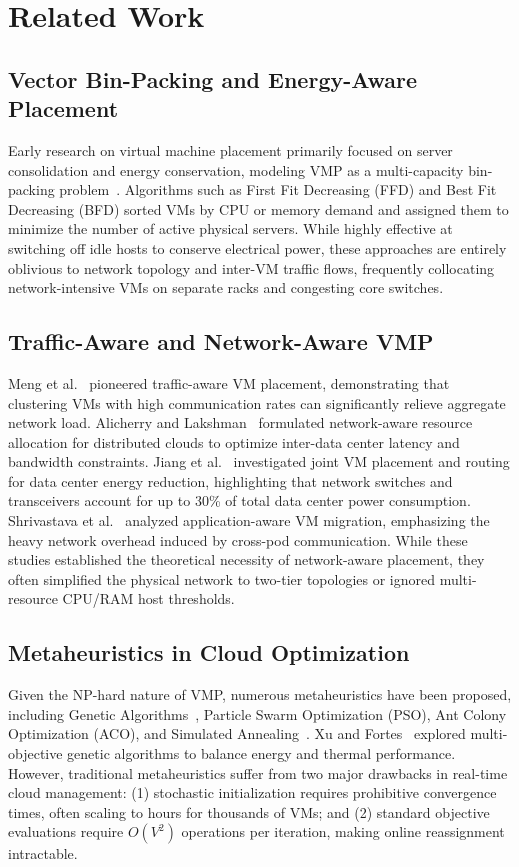 \documentclass[conference]{IEEEtran}
\begin{document}
\section{Related Work}
\label{sec:related}

\subsection{Vector Bin-Packing and Energy-Aware Placement}
Early research on virtual machine placement primarily focused on server consolidation and energy conservation, modeling VMP as a multi-capacity bin-packing problem~\cite{beloglazov2012optimal, mann2015allocation}. Algorithms such as First Fit Decreasing (FFD) and Best Fit Decreasing (BFD) sorted VMs by CPU or memory demand and assigned them to minimize the number of active physical servers. While highly effective at switching off idle hosts to conserve electrical power, these approaches are entirely oblivious to network topology and inter-VM traffic flows, frequently collocating network-intensive VMs on separate racks and congesting core switches.

\subsection{Traffic-Aware and Network-Aware VMP}
Meng et al.~\cite{meng2010improving} pioneered traffic-aware VM placement, demonstrating that clustering VMs with high communication rates can significantly relieve aggregate network load. Alicherry and Lakshman~\cite{alicherry2012network} formulated network-aware resource allocation for distributed clouds to optimize inter-data center latency and bandwidth constraints. Jiang et al.~\cite{joint2012joint} investigated joint VM placement and routing for data center energy reduction, highlighting that network switches and transceivers account for up to 30\% of total data center power consumption. Shrivastava et al.~\cite{shrivastava2011application} analyzed application-aware VM migration, emphasizing the heavy network overhead induced by cross-pod communication. While these studies established the theoretical necessity of network-aware placement, they often simplified the physical network to two-tier topologies or ignored multi-resource CPU/RAM host thresholds.

\subsection{Metaheuristics in Cloud Optimization}
Given the NP-hard nature of VMP, numerous metaheuristics have been proposed, including Genetic Algorithms~\cite{xu2014multi}, Particle Swarm Optimization (PSO), Ant Colony Optimization (ACO), and Simulated Annealing~\cite{kirkpatrick1983optimization}. Xu and Fortes~\cite{xu2014multi} explored multi-objective genetic algorithms to balance energy and thermal performance. However, traditional metaheuristics suffer from two major drawbacks in real-time cloud management: (1) stochastic initialization requires prohibitive convergence times, often scaling to hours for thousands of VMs; and (2) standard objective evaluations require $O(V^2)$ operations per iteration, making online reassignment intractable.
\end{document}
